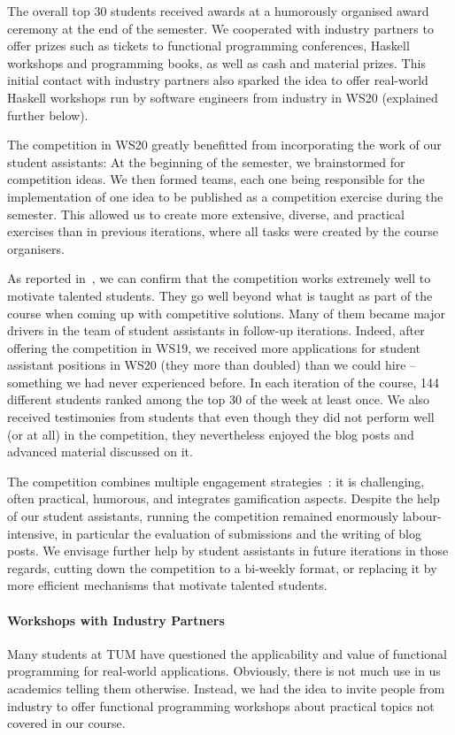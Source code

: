 The overall top 30 students received awards at
a humorously organised award ceremony at the end of the semester.
We cooperated with industry partners
to offer prizes such as tickets to functional programming conferences,
Haskell workshops and programming books, as well as cash and material prizes.
This initial contact with industry partners
also sparked the idea to offer real-world Haskell workshops
run by software engineers from industry in WS20 (explained further below).

The competition in WS20 greatly benefitted from incorporating the work of our student assistants:
At the beginning of the semester,
we brainstormed for competition ideas.
We then formed teams, each one being responsible for the
implementation of one idea to be published as a competition exercise during the semester.
This allowed us to create more extensive, diverse,
and practical exercises than in previous iterations,
where all tasks were created by the course organisers.

As reported in~\cite{next_1100},
we can confirm that the competition works extremely well to motivate talented students.
They go well beyond what is taught as part of the course when coming up with competitive solutions.
Many of them became major drivers in
the team of student assistants in follow-up iterations.
Indeed, after offering the competition in WS19,
we received more applications for student assistant positions in WS20 (they more than doubled) than we could hire -- something we had never experienced before.
In each iteration of the course, 144 different students ranked among the top 30 of the week at least once.
We also received testimonies from students that even though they did not perform well (or at all) in the competition,
they nevertheless enjoyed the blog posts and advanced material discussed on it.

The competition combines multiple
engagement strategies~\cite{onlineengagement5,engagementproposals}:
it is challenging, often practical, humorous,
and integrates gamification aspects.
Despite the help of our student assistants,
running the competition remained enormously labour-intensive,
in particular the evaluation of submissions and
the writing of blog posts.
We envisage further help by student assistants in future iterations in those regards,
cutting down the competition to a bi-weekly format,
or replacing it by more efficient mechanisms that motivate talented students.

\paragraph{Workshops with Industry Partners}
Many students at TUM have questioned the applicability and value of functional programming for real-world applications.
Obviously, there is not much use in us academics telling
them otherwise.
Instead, we had the idea to invite people from industry
to offer functional programming workshops about
practical topics not covered in our course.

